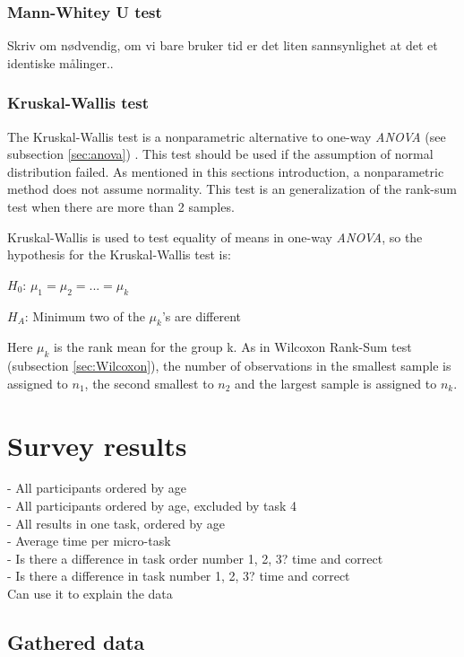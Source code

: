 \subsubsection{Mann-Whitey U test}
Skriv om nødvendig, om vi bare bruker tid er det liten sannsynlighet at det et identiske målinger.. 

\subsubsection[Kruskal]{Kruskal-Wallis test}
The Kruskal-Wallis test is a nonparametric alternative to one-way \textit{ANOVA} (see subsection \ref{sec:anova})  \citep{Walpole2012}. This test should be used if the assumption of normal distribution failed. As mentioned in this sections introduction, a nonparametric method does not assume normality. This test is an generalization of the rank-sum test when there are more than 2 samples.

Kruskal-Wallis is used to test equality of means in one-way \textit{ANOVA}, so the hypothesis for the Kruskal-Wallis test is:\newline

\centerline{$H_{0}$:  $\mu_{1} =  \mu_{2} = ... = \mu_{k} $} 
\centerline{$H_{A}$: Minimum two of the $\mu_{k}$'s are different}

Here $\mu_{k}$ is the rank mean for the group k. As in Wilcoxon Rank-Sum test (subsection \ref{sec:Wilcoxon}), the number of observations in the smallest sample is assigned to $n_1$, the second smallest to $n_2$ and the largest sample is assigned to $n_k$. 

\section{Survey results}\label{sec:survey_results}


- All participants ordered by age \\
- All participants ordered by age, excluded by task 4 \\
- All results in one task, ordered by age \\ 
- Average time per micro-task \\
- Is there a difference in task order number 1, 2, 3? time and correct \\
- Is there a difference in task number 1, 2, 3? time and correct  \\
Can use it to explain the data

\subsection{Gathered data}\label{sec:gathereddata}

